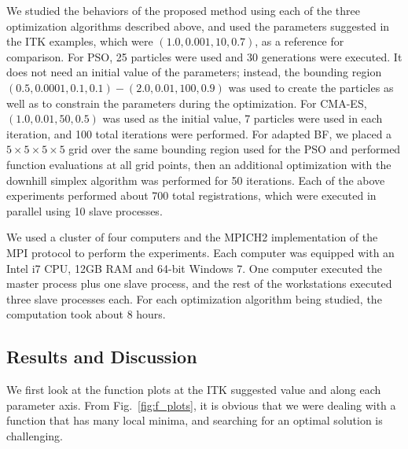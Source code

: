 \documentclass[]{spie}  %
\begin{document}
We studied the behaviors of the proposed method using each of the three optimization algorithms described above, and used the parameters suggested in the ITK examples, which were $(1.0,0.001,10,0.7)$, as a reference for comparison.
For PSO, 25 particles were used and 30 generations were executed. It does not need an initial value of the parameters; instead, the bounding region $(0.5,0.0001,0.1,0.1)-(2.0,0.01,100,0.9)$ was used to create the particles as well as to constrain the parameters during the optimization.
For CMA-ES, $(1.0,0.01,50,0.5)$ was used as the initial value, 7 particles were used in each iteration, and 100 total iterations were performed.
For adapted BF, we placed a $5 \times 5 \times 5 \times 5$ grid over the same bounding region used for the PSO and performed function evaluations at all grid points, then an additional optimization with the downhill simplex algorithm was performed for 50 iterations. Each of the above experiments performed about 700 total registrations, which were executed in  parallel using 10 slave processes.

We used a cluster of four computers and the MPICH2 implementation of the MPI protocol to perform the experiments. Each computer was equipped with an Intel i7 CPU, 12GB RAM and 64-bit Windows 7. One computer executed the master process plus one slave process, and the rest of the workstations executed three slave processes each. For each optimization algorithm being studied, the computation took about 8 hours.

\subsection{Results and Discussion}

We first look at the function plots at the ITK suggested value and along each parameter axis. From Fig.~\ref{fig:f_plots}, it is obvious that we were dealing with a function that has many local minima, and searching for an optimal solution is challenging.
\end{document}
